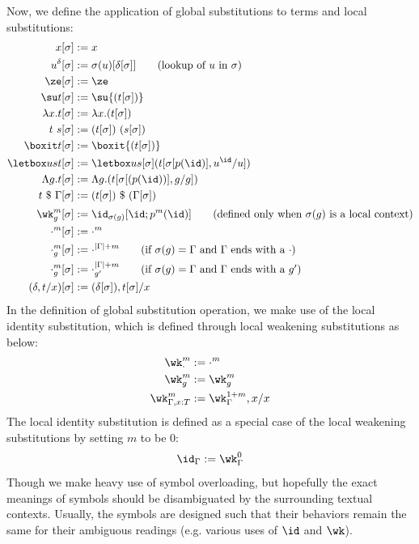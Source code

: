 Now, we define the application of global substitutions to terms and local substitutions:
\begin{align*}
  x[\sigma] &:= x \\
  u^{\delta}[\sigma] &:= \sigma(u)[\delta[\sigma]]
                        \tag{lookup of $u$ in $\sigma$} \\
  \ze[\sigma] &:= \ze \\
  \su t[\sigma] &:= \su{(t[\sigma])} \\
  \lambda x. t[\sigma] &:= \lambda x. (t[\sigma]) \\
  t~s[\sigma] &:= (t[\sigma])~(s[\sigma]) \\
  \boxit t [\sigma] &:= \boxit {(t[\sigma])} \\
  \letbox u s t[\sigma] &:= \letbox u {s[\sigma]} {(t[\sigma[p(\id)], u^\id/u])} \\
  \Lambda g. t [\sigma] &:= \Lambda g. (t[\sigma[(p(\id))], g/g]) \\
  t~\$~\Gamma [\sigma] &:= (t[\sigma]) ~\$~(\Gamma[\sigma]) \\[.25em]
  \wk_g^m [\sigma] &:= \id_{\sigma(g)}[\id; p^m(\id)]
                     \tag{defined only when $\sigma(g)$ is a local context}\\
  \cdot^m [\sigma] &:= \cdot^m \\
  \cdot_{g}^m [\sigma] &:= \cdot^{|\Gamma| + m}
  \tag{if $\sigma(g) = \Gamma$ and $\Gamma$ ends with a $\cdot$} \\
  \cdot_{g}^m [\sigma] &:= \cdot_{g'}^{|\Gamma| + m}
  \tag{if $\sigma(g) = \Gamma$ and $\Gamma$ ends with a $g'$} \\
  (\delta, t/x) [\sigma] &:= (\delta[\sigma]), t[\sigma]/x
\end{align*}
In the definition of global substitution operation, we make use of the local identity
substitution, which is defined through local weakening substitutions as below:
\begin{align*}
  \wk^m_{\cdot} &:=  \cdot^m \\
  \wk^m_{g} &:=  \wk_g^m \\
  \wk^m_{\Gamma, x : T} &:= \wk^{1 + m}_{\Gamma}, x/x
\end{align*}
The local identity substitution is defined as a special case of the local weakening
substitutions by setting $m$ to be $0$:
\begin{align*}
  \id_{\Gamma} := \wk^0_{\Gamma}
\end{align*}
Though we make heavy use of symbol overloading, but hopefully the exact meanings of
symbols should be disambiguated by the surrounding textual contexts. %
Usually, the symbols are designed such that their behaviors remain the same for their
ambiguous readings (e.g. various uses of $\id$ and $\wk$).  %

